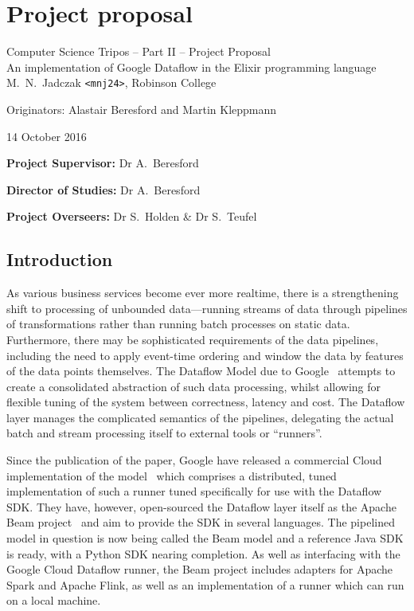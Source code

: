 \chapter{Project proposal}

\begin{center}
\Large
Computer Science Tripos -- Part II -- Project Proposal\\[4mm]
\LARGE
An implementation of Google Dataflow in the Elixir programming language\\[4mm]

\large
M.~N.~Jadczak \texttt{<mnj24>}, Robinson College

Originators: Alastair Beresford and Martin Kleppmann

14 October 2016
\end{center}

\vspace{5mm}

\textbf{Project Supervisor:} Dr A.~Beresford

\textbf{Director of Studies:} Dr A.~Beresford

\textbf{Project Overseers:} Dr S.~Holden  \& Dr S.~Teufel


\section*{Introduction}

As various business services become ever more realtime, there is a strengthening shift to processing of unbounded data---running streams of data through pipelines of transformations rather than running batch processes on static data. Furthermore, there may be sophisticated requirements of the data pipelines, including the need to apply event-time ordering and window the data by features of the data points themselves. The Dataflow Model due to Google~\cite{Akidau:2015} attempts to create a consolidated abstraction of such data processing, whilst allowing for flexible tuning of the system between correctness, latency and cost. The Dataflow layer manages the complicated semantics of the pipelines, delegating the actual batch and stream processing itself to external tools or ``runners''.

Since the publication of the paper, Google have released a commercial Cloud implementation of the model~\cite{CloudDataflow} which comprises a distributed, tuned implementation of such a runner tuned specifically for use with the Dataflow SDK. They have, however, open-sourced the Dataflow layer itself as the Apache Beam project~\cite{ApacheBeam} and aim to provide the SDK in several languages. The pipelined model in question is now being called the Beam model and a reference Java SDK is ready, with a Python SDK nearing completion. As well as interfacing with the Google Cloud Dataflow runner, the Beam project includes adapters for Apache Spark and Apache Flink, as well as an implementation of a runner which can run on a local machine.

